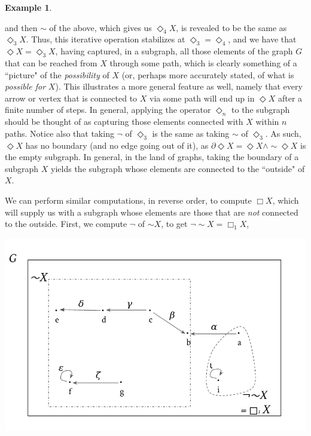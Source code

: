 \documentclass[11pt]{book}
\theoremstyle{definition}
\newtheorem{example}{Example}[section]
\theoremstyle{definition}
\theoremstyle{definition}
\theoremstyle{theorem}
\theoremstyle{definition}
\begin{document}
\begin{example}
\begin{center}
	\end{center}  
	and then $\sim$ of the above, which gives us $\Diamond_4 X$, is revealed to be the same as $\Diamond_3 X$.
	Thus, this iterative operation stabilizes at $\Diamond_3 = \Diamond_4$, and we have that $\Diamond X = \Diamond_3 X$, having captured, in a subgraph, all those elements of the graph $G$ that can be reached from $X$ through some path, which is clearly something of a ``picture" of the \textit{possibility} of $X$ (or, perhaps more accurately stated, of what is \textit{possible for} $X$). This illustrates a more general feature as well, namely that every arrow or vertex that is connected to $X$ via some path will end up in $\Diamond X$ after a finite number of steps. In general, applying the operator $\Diamond_n$ to the subgraph should be thought of as capturing those elements connected with $X$ within $n$ paths. Notice also that taking $\neg$ of $\Diamond_3$ is the same as taking $\sim$ of $\Diamond_3$. As such, $\Diamond X$ has no boundary (and no edge going out of it), as $\partial \Diamond X = \Diamond X \wedge \sim \Diamond X$ is the empty subgraph. In general, in the land of graphs, taking the boundary of a subgraph $X$ yields the subgraph whose elements are connected to the ``outside" of $X$.\par 
	We can perform similar computations, in reverse order, to compute $\Box X$, which will supply us with a subgraph whose elements are those that are \textit{not} connected to the outside. First, we compute $\neg$ of $\sim X$, to get $\neg \sim X = \Box_1 X$, 
	\begin{center}
		\includegraphics*[scale=0.24]{GraphSubgraphNegation11.png}
	\end{center}       

\end{example}
\end{document}
